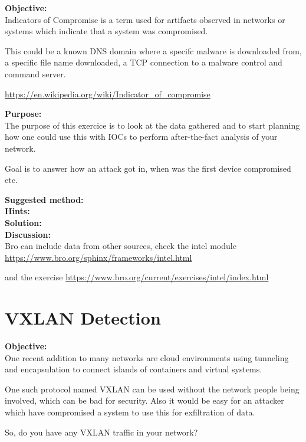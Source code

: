 \documentclass[a4paper,11pt,notitlepage]{report}
\begin{document}
{\bf Objective:} \\
Indicators of Compromise is a term used for artifacts observed in networks or systems which indicate that a system was compromised.

This could be a known DNS domain where a specifc malware is downloaded from, a specific file name downloaded, a TCP connection to a malware control and command server.

\url{https://en.wikipedia.org/wiki/Indicator_of_compromise}

{\bf Purpose:}\\
The purpose of this exercice is to look at the data gathered and to start planning how one could use this with IOCs to perform after-the-fact analysis of your network.

Goal is to answer how an attack got in, when was the first device compromised etc.


{\bf Suggested method:}\\



{\bf Hints:}\\



{\bf Solution:}\\



{\bf Discussion:}\\

Bro can include data from other sources, check the intel module
\url{https://www.bro.org/sphinx/frameworks/intel.html}

and the exercise \url{https://www.bro.org/current/exercises/intel/index.html}

\chapter{VXLAN Detection}
\label{ex:vxlandetect}


{\bf Objective:} \\
One recent addition to many networks are cloud environments using tunneling and encapsulation to connect islands of containers and virtual systems.

One such protocol named VXLAN can be used without the network people being involved, which can be bad for security. Also it would be easy for an attacker which have compromised a system to use this for exfiltration of data.

So, do you have any VXLAN traffic in your network?
\end{document}
